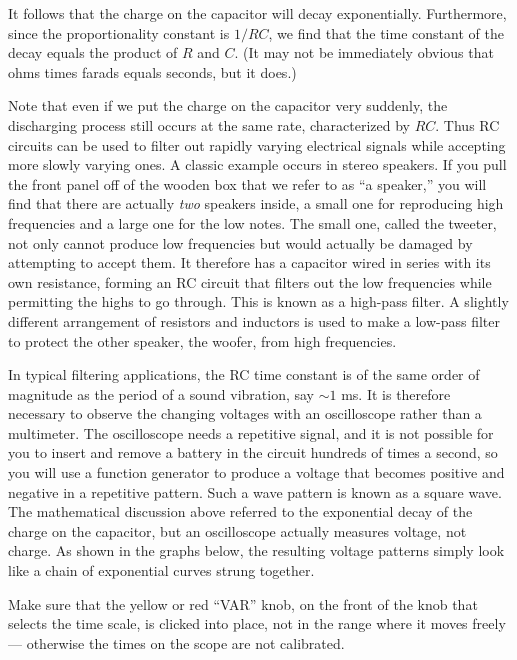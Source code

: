 It follows that the charge on the capacitor will decay
exponentially. Furthermore, since the proportionality
constant is $1/RC$, we find that the time constant of the
decay equals the product of $R$ and $C$. (It may not be
immediately obvious that ohms times farads equals seconds, but it does.)

Note that even if we put the charge on the capacitor very
suddenly, the discharging process still occurs at the same
rate, characterized by $RC$. Thus RC circuits can be used to
filter out rapidly varying electrical signals while
accepting more slowly varying ones. A classic example occurs
in stereo speakers. If you pull the front panel off of the
wooden box that we refer to as ``a speaker,'' you will find
that there are actually \emph{two} speakers inside, a small
one for reproducing high frequencies and a large one for the
low notes. The small one, called the tweeter, not only
cannot produce low frequencies but would actually be damaged
by attempting to accept them. It therefore has a capacitor
wired in series with its own resistance, forming an RC
circuit that filters out the low frequencies while
permitting the highs to go through. This is known as a
high-pass filter. A slightly different arrangement of
resistors and inductors is used to make a low-pass filter
to protect the other speaker, the woofer, from high frequencies. 

\observations


In typical filtering applications, the RC time constant is
of the same order of magnitude as the period of a sound
vibration, say $\sim1$ ms. It is therefore necessary to
observe the changing voltages with an oscilloscope rather
than a multimeter. The oscilloscope needs a repetitive
signal, and it is not possible for you to insert and remove
a battery in the circuit hundreds of times a second, so you
will use a function generator to produce a voltage that
becomes positive and negative in a repetitive pattern. Such
a wave pattern is known as a square wave. The mathematical
discussion above referred to the exponential decay of the
charge on the capacitor, but an oscilloscope actually
measures voltage, not charge. As shown in the graphs below,
the resulting voltage patterns simply look like a chain of
exponential curves strung together.



Make sure that the yellow or red ``VAR'' knob, on the front of the
knob that selects the time scale, is clicked into place, not
in the range where it moves freely --- otherwise the times
on the scope are not calibrated.

